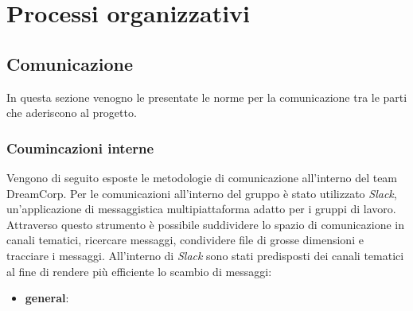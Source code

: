 \section{Processi organizzativi}
    \subsection{Comunicazione}
        In questa sezione venogno le presentate le norme per la comunicazione tra le parti che aderiscono al progetto.
        \subsubsection{Coumincazioni interne}
            Vengono di seguito esposte le metodologie di comunicazione all'interno del team DreamCorp.
            \newline
            Per le comunicazioni all'interno del gruppo è stato utilizzato \textit{Slack}, un'applicazione di messaggistica multipiattaforma adatto per i gruppi di lavoro. Attraverso questo strumento è possibile suddividere lo spazio di comunicazione in canali tematici, ricercare messaggi, condividere file di grosse dimensioni e tracciare i messaggi.
            \newline
            All'interno di \textit{Slack} sono stati predisposti dei canali tematici al fine di rendere più efficiente lo scambio di messaggi:
            \begin{itemize}
                \item \textbf{general}:
            \end{itemize}
            
            